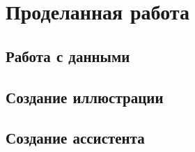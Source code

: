 \chapter{Проделанная работа}



\section{Работа с данными}


\section{Создание иллюстрации}


\cite{rombach2022highresolution}\cite{song2020generative}

\section{Создание ассистента}











